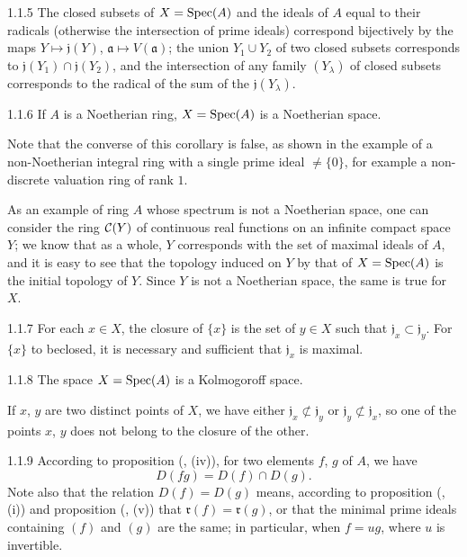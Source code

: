 \begin{env}[Corollary]{1.1.5}
\label{cor-1.1.1.5}
The closed subsets of $X=\operatorname{Spec}(A)$ and the ideals of $A$ equal to their radicals (otherwise the
intersection of prime ideals) correspond bijectively by the  maps $Y\mapsto\mathfrak{j}(Y)$,
$\mathfrak{a}\mapsto V(\mathfrak{a})$; the union $Y_1\cup Y_2$ of two closed subsets corresponds to
$\mathfrak{j}(Y_1)\cap\mathfrak{j}(Y_2)$, and the intersection of any family $(Y_\lambda)$ of closed subsets
corresponds to the radical of the sum of the $\mathfrak{j}(Y_\lambda)$.
\end{env}

\begin{env}[Corollary]{1.1.6}
\label{cor-1.1.1.6}
If $A$ is a Noetherian ring, $X=\operatorname{Spec}(A)$ is a Noetherian space.
\end{env}
Note that the converse of this corollary is false, as shown
in the example of a non-Noetherian integral ring with a single prime ideal $\neq\{0\}$, for
example a non-discrete valuation ring of rank $1$.

As an example of ring $A$ whose spectrum is not a Noetherian space, one
can consider the ring $\mathcal{C}(Y)$ of continuous real functions on an infinite compact space
$Y$; we know that as a whole, $Y$ corresponds with the set of maximal ideals
of $A$, and it is easy to see that the topology induced on $Y$ by that of $X=\operatorname{Spec}(A)$
is the initial topology of $Y$. Since $Y$ is not a Noetherian space, the same is true for $X$.

\begin{env}[Corollary]{1.1.7}
\label{cor-1.1.1.7}
For each $x\in X$, the closure of $\{x\}$ is the set of $y\in X$ such that $\mathfrak{j}_x\subset\mathfrak{j}_y$.
For $\{x\}$ to beclosed, it is necessary and sufficient that $\mathfrak{j}_x$ is maximal.
\end{env}

\begin{env}[Corollary]{1.1.8}
\label{cor-1.1.1.8}
The space $X=\operatorname{Spec}(A)$ is a Kolmogoroff space.
\end{env}

If $x$, $y$ are two distinct points of $X$, we have either $\mathfrak{j}_x\not\subset\mathfrak{j}_y$ or
$\mathfrak{j}_y\not\subset\mathfrak{j}_x$, so one of the points $x$, $y$ does not belong to the closure of the other.

\begin{env}{1.1.9}
\label{env-1.1.1.9}
According to proposition (, (iv)), for two elements $f$, $g$ of $A$, we have
\[
  D(fg)=D(f)\cap D(g).\tag{1.1.9.1}
\]
Note also that the relation $D(f)=D(g)$ means, according to proposition (, (i))
and proposition (, (v)) that $\mathfrak{r}(f)=\mathfrak{r}(g)$, or that the minimal prime ideals
containing $(f)$ and $(g)$ are the same; in particular, when $f=ug$, where $u$ is invertible.
\end{env}

